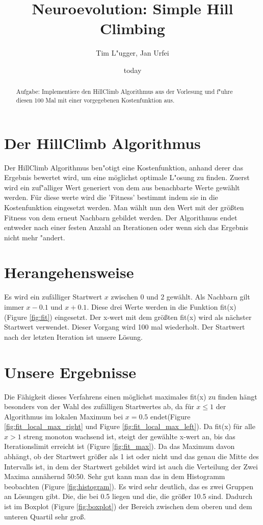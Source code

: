 \documentclass{hbrs-ecta-report}
\begin{document}

\title{Neuroevolution: Simple Hill Climbing}
\subtitle{}

\author{
\alignauthor
Tim L"ugger, Jan Urfei
}

\date{today}
\maketitle
\begin{abstract}
Aufgabe: Implementiere den HillClimb Algorithmus aus der Vorlesung und f"uhre diesen 100 Mal mit einer vorgegebenen Kostenfunktion aus.
\end{abstract}

\section{Der HillClimb Algorithmus}
Der HillClimb Algorithmus ben"otigt eine Kostenfunktion, anhand derer das Ergebnis bewertet wird, um eine möglichst optimale L"osung zu finden. Zuerst wird ein zuf"alliger Wert generiert von dem aus benachbarte Werte gewählt werden. Für diese werte wird die 'Fitness' bestimmt indem sie in die Kostenfunktion eingesetzt werden. Man wählt nun den Wert mit der größten Fitness von dem erneut Nachbarn gebildet werden. Der Algorithmus endet entweder nach einer festen Anzahl an Iterationen oder wenn sich das Ergebnis nicht mehr "andert.

\section{Herangehensweise}

Es wird ein zufälliger Startwert $x$ zwischen $0$ und $2$ gewählt. Als Nachbarn gilt immer $x - 0.1$ und $x + 0.1$. Diese drei Werte werden in die Funktion fit(x) (Figure \ref{fig:fit}) eingesetzt. Der x-wert mit dem größten fit(x) wird als nächster Startwert verwendet. Dieser Vorgang wird 100 mal wiederholt. Der Startwert nach der letzten Iteration ist unsere Lösung. 



\section{Unsere Ergebnisse}
Die Fähigkeit dieses Verfahrens einen möglichst maximales fit(x) zu finden hängt besonders von der Wahl des zufälligen Startwertes ab, da für $x\leq1$ der Algorithmus im lokalen Maximum bei $x=0.5$ endet(Figure \ref{fig:fit_local_max_right} und Figure \ref{fig:fit_local_max_left}). Da fit(x) für alle $x>1$ streng monoton wachsend ist, steigt der gewählte x-wert 
an, bis das Iterationslimit erreicht ist (Figure \ref{fig:fit_max}). 
Da das Maximum davon abhängt, ob der Startwert größer als 1 ist oder nicht und das genau die Mitte des Intervalls ist, in dem der Startwert gebildet wird ist auch die Verteilung der Zwei Maxima annähernd 50:50. Sehr gut kann man das in dem Histogramm beobachten (Figure \ref{fig:histogram}). Es wird sehr deutlich, das es zwei Gruppen an Lösungen gibt. Die, die bei 0.5 liegen und die, die größer 10.5 sind. Dadurch ist im Boxplot (Figure \ref{fig:boxplot}) der Bereich zwischen dem oberen und dem unteren Quartil sehr groß.
\end{document}
